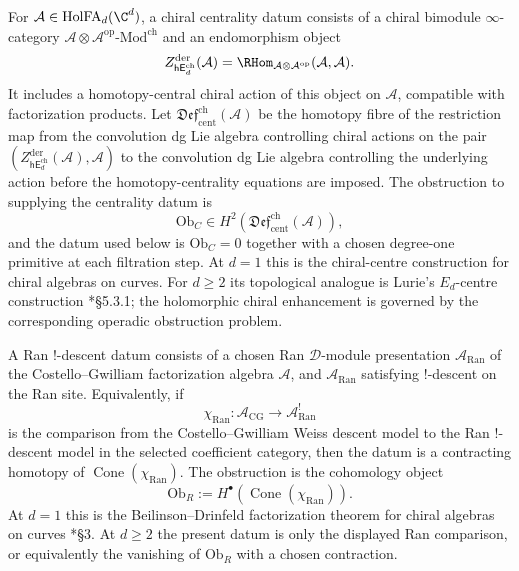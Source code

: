 \begin{defn}\label{app:hyp:centrality}
For \(\mathcal A\in\mathrm{HolFA}_d(\C^d)\), a chiral centrality datum
consists of a chiral bimodule \(\infty\)-category
\(\mathcal A\otimes\mathcal A^{\mathrm{op}}\text{-Mod}^{\mathrm{ch}}\)
and an endomorphism object
\[
  Z^{\mathrm{der}}_{\mathsf{hE}_d^{\mathrm{ch}}}(\mathcal A)
   =\RHom_{\mathcal A\otimes\mathcal A^{\mathrm{op}}}(\mathcal A,\mathcal A).
\]
It includes a homotopy-central chiral action of this object on
\(\mathcal A\), compatible with factorization products.  Let
\(\mathfrak{Def}^{\mathrm{ch}}_{\mathrm{cent}}(\mathcal A)\) be the
homotopy fibre of the restriction map from the convolution dg Lie
algebra controlling chiral actions on the pair
\((Z^{\mathrm{der}}_{\mathsf{hE}_d^{\mathrm{ch}}}(\mathcal A),
\mathcal A)\) to the convolution dg Lie algebra controlling the
underlying action before the homotopy-centrality equations are imposed.
The obstruction to supplying the centrality datum is
\[
  \mathrm{Ob}_{C}\in
  H^2\!\left(\mathfrak{Def}^{\mathrm{ch}}_{\mathrm{cent}}(\mathcal A)\right),
\]
and the datum used below is \(\mathrm{Ob}_{C}=0\) together with a
chosen degree-one primitive at each filtration step.
At \(d=1\) this is the chiral-centre construction for chiral algebras
on curves.
For \(d\geq2\) its topological analogue is Lurie's
\(E_d\)-centre construction \cite{lurie-ha}*{\S 5.3.1}; the
holomorphic chiral enhancement is governed by the corresponding
operadic obstruction problem.
\end{defn}

\begin{defn}\label{app:hyp:ran-descent}
A Ran \( ! \)-descent datum consists of a chosen Ran
\(\mathcal D\)-module presentation
\(\mathcal A_{\mathrm{Ran}}\) of the Costello--Gwilliam
factorization algebra \(\mathcal A\), and \(\mathcal A_{\mathrm{Ran}}\)
satisfying \( ! \)-descent on the Ran site.  Equivalently, if
\[
  \chi_{\mathrm{Ran}}\colon
  \mathcal A_{\mathrm{CG}}\longrightarrow
  \mathcal A_{\mathrm{Ran}}^{!}
\]
is the comparison from the Costello--Gwilliam Weiss descent model to the
Ran \( ! \)-descent model in the selected coefficient category, then the
datum is a contracting homotopy of
\(\operatorname{Cone}(\chi_{\mathrm{Ran}})\).  The obstruction is the
cohomology object
\[
  \mathrm{Ob}_{R}:=
  H^\bullet\!\left(\operatorname{Cone}(\chi_{\mathrm{Ran}})\right).
\]
At \(d=1\) this is the Beilinson--Drinfeld factorization theorem for
chiral algebras on curves \cite{beilinson-drinfeld-chiral}*{\S 3}.  At
\(d\geq2\) the present datum is only the displayed Ran comparison, or
equivalently the vanishing of \(\mathrm{Ob}_{R}\) with a chosen
contraction.
\end{defn}

